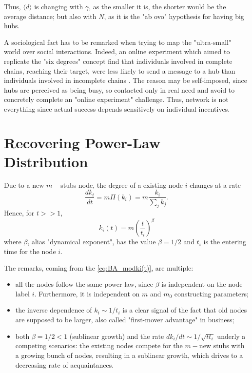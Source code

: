 \documentclass[a4paper,12pt,twoside]{book} %
\theoremstyle{definition}
\begin{document}
Thus, \(\langle d \rangle\) is changing with $\gamma$, as the smaller it is, the shorter would be the average distance; but also with $N$, as it is the "ab ovo" hypothesis for having big hubs.

A sociological fact has to be remarked when trying to map the "ultra-small" world over social interactions. Indeed, an online experiment which aimed to replicate the "six degrees" concept find that individuals involved in complete chains, reaching their target, were less likely to send a message to a hub than individuals involved in incomplete chains \cite{Dodds:2003_GSonlineNet_6deg}. The reason may be self-imposed, since hubs are perceived as being busy, so contacted only in real need and avoid to concretely complete an "online experiment" challenge. Thus, network is not everything since actual success depends sensitively on individual incentives.

\newpage
\section{Recovering Power-Law Distribution}
\label{App:RecPLD}
Due to a new $m-$stubs node, the degree of a existing node $i$ changes at a rate
\begin{equation}
	\frac{dk_i}{dt} = m \Pi(k_i) = m \frac{k_i}{\sum_j k_j}
	\label{eq:BA_dk_i/dt}
	.
\end{equation}
Hence, for $t >> 1$, 
\begin{equation}
	k_i(t) = m \left(\frac{t}{t_i}\right)^\beta
	\label{eq:BA_modki(t)}
\end{equation}
where $\beta$, alias "dynamical exponent", has the value $\beta = 1/2$ \cite{barabasi::2016networkbook} and $t_i$ is the entering time for the node $i$.

The remarks, coming from the \autoref{eq:BA_modki(t)}, are multiple:
\begin{itemize}
	\item all the nodes follow the same power law, since $\beta$ is independent on the node label $i$. Furthermore, it is independent on $m$ and $m_0$ constructing parameters;
	\item the inverse dependence of $k_i \sim 1/t_i$ is a clear signal of the fact that old nodes are supposed to be larger, also called "first-mover advantage" in business;
	\item both $\beta = 1/2 < 1$ (sublinear growth) and the rate $dk_i/dt \sim 1/\sqrt{tt_i}$ underly a competing scenarios:
	the existing nodes compete for the $m-$new stubs with a growing bunch of nodes, resulting in a sublinear growth, which drives to a decreasing rate of acquaintances. 
\end{itemize}
\end{document}
